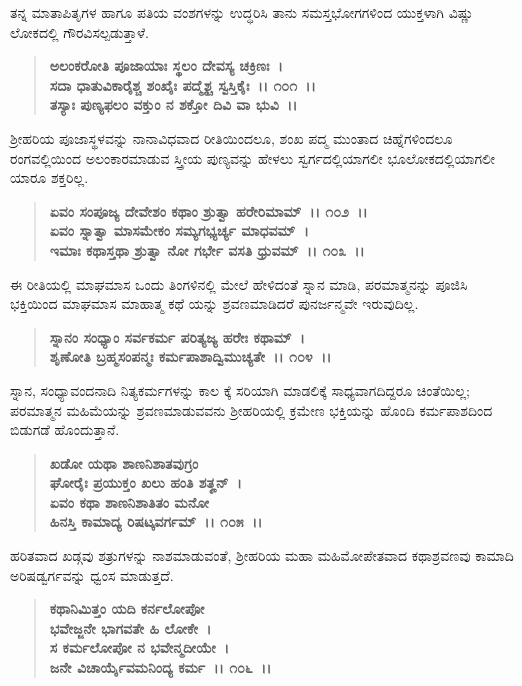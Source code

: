 ತನ್ನ ಮಾತಾಪಿತೃಗಳ ಹಾಗೂ ಪತಿಯ ವಂಶಗಳನ್ನು ಉದ್ಧರಿಸಿ ತಾನು ಸಮಸ್ತಭೋಗಗಳಿಂದ ಯುಕ್ತಳಾಗಿ ವಿಷ್ಣು ಲೋಕದಲ್ಲಿ ಗೌರವಿಸಲ್ಪಡುತ್ತಾಳೆ.

\begin{verse}
\textbf{ಅಲಂಕರೋತಿ ಪೂಜಾಯಾಃ ಸ್ಥಲಂ ದೇವಸ್ಯ ಚಕ್ರಿಣಃ~।}\\\textbf{ಸದಾ ಧಾತುವಿಕಾರೈಶ್ಚ ಶಂಖೈಃ ಪದ್ಮೈಶ್ಚ ಸ್ವಸ್ತಿಕೈಃ~।। ೧೦೧~।।}\\\textbf{ತಸ್ಯಾಃ ಪುಣ್ಯಫಲಂ ವಕ್ತುಂ ನ ಶಕ್ತೋ ದಿವಿ ವಾ ಭುವಿ~।।}
\end{verse}

ಶ‍್ರೀಹರಿಯ ಪೂಜಾಸ್ಥಳವನ್ನು ನಾನಾವಿಧವಾದ ರೀತಿಯಿಂದಲೂ, ಶಂಖ ಪದ್ಮ ಮುಂತಾದ ಚಿಹ್ನೆಗಳಿಂದಲೂ ರಂಗವಲ್ಲಿಯಿಂದ ಅಲಂಕಾರಮಾಡುವ ಸ್ತ್ರೀಯ ಪುಣ್ಯವನ್ನು ಹೇಳಲು ಸ್ವರ್ಗದಲ್ಲಿಯಾಗಲೀ ಭೂಲೋಕದಲ್ಲಿಯಾಗಲೀ ಯಾರೂ ಶಕ್ತರಿಲ್ಲ.

\begin{verse}
\textbf{ಏವಂ ಸಂಪೂಜ್ಯ ದೇವೇಶಂ ಕಥಾಂ ಶ್ರುತ್ವಾ ಹರೇರಿಮಾಮ್~।। ೧೦೨~।।}\\\textbf{ಏವಂ ಸ್ನಾತ್ವಾ ಮಾಸಮೇಕಂ ಸಮ್ಯಗಭ್ಯರ್ಚ್ಯ ಮಾಧವಮ್~।}\\\textbf{ಇಮಾಃ ಕಥಾಸ್ತಥಾ ಶ್ರುತ್ವಾ ನೋ ಗರ್ಭೇ ವಸತಿ ಧ್ರುವಮ್~।। ೧೦೩~।।}
\end{verse}

ಈ ರೀತಿಯಲ್ಲಿ ಮಾಘಮಾಸ ಒಂದು ತಿಂಗಳಿನಲ್ಲಿ ಮೇಲೆ ಹೇಳಿದಂತೆ ಸ್ನಾನ ಮಾಡಿ, ಪರಮಾತ್ಮನನ್ನು ಪೂಜಿಸಿ ಭಕ್ತಿಯಿಂದ ಮಾಘಮಾಸ ಮಾಹಾತ್ಮ ಕಥೆ ಯನ್ನು ಶ್ರವಣಮಾಡಿದರೆ ಪುನರ್ಜನ್ಮವೇ ಇರುವುದಿಲ್ಲ.

\begin{verse}
\textbf{ಸ್ನಾನಂ ಸಂಧ್ಯಾಂ ಸರ್ವಕರ್ಮ ಪರಿತ್ಯಜ್ಯ ಹರೇಃ ಕಥಾಮ್~।}\\\textbf{ಶೃಣೋತಿ ಬ್ರಹ್ಮಸಂಪನ್ಮಃ ಕರ್ಮಪಾಶಾದ್ವಿಮುಚ್ಯತೇ~।। ೧೦೪~।।}
\end{verse}

ಸ್ನಾನ, ಸಂಧ್ಯಾವಂದನಾದಿ ನಿತ್ಯಕರ್ಮಗಳನ್ನು ಕಾಲ ಕ್ಕೆ ಸರಿಯಾಗಿ ಮಾಡಲಿಕ್ಕೆ ಸಾಧ್ಯವಾಗದಿದ್ದರೂ ಚಿಂತೆಯಿಲ್ಲ; ಪರಮಾತ್ಮನ ಮಹಿಮೆಯನ್ನು ಶ್ರವಣಮಾಡುವವನು ಶ‍್ರೀಹರಿಯಲ್ಲಿ ಕ್ರಮೇಣ ಭಕ್ತಿಯನ್ನು ಹೊಂದಿ ಕರ್ಮಪಾಶದಿಂದ ಬಿಡುಗಡೆ ಹೊಂದುತ್ತಾನೆ.

\begin{verse}
\textbf{ಖಡೋ ಯಥಾ ಶಾಣನಿಶಾತವುಗ್ರಂ}\\\textbf{ಘೋರೈಃ ಪ್ರಯುಕ್ತಂ ಖಲು ಹಂತಿ ಶತೄನ್~। }\\\textbf{ಏವಂ ಕಥಾ ಶಾಣನಿಶಾತಿತಂ ಮನೋ} \\\textbf{ಹಿನಸ್ತಿ ಕಾಮಾದ್ಯ ರಿಷಟ್ಕವರ್ಗಮ್~।। ೧೦೫~।।}
\end{verse}

ಹರಿತವಾದ ಖಡ್ಗವು ಶತ್ರುಗಳನ್ನು ನಾಶಮಾಡುವಂತೆ, ಶ‍್ರೀಹರಿಯ ಮಹಾ ಮಹಿಮೋಪೇತವಾದ ಕಥಾಶ್ರವಣವು ಕಾಮಾದಿ ಅರಿಷಡ್ವರ್ಗವನ್ನು ಧ್ವಂಸ ಮಾಡುತ್ತದೆ.

\begin{verse}
\textbf{ಕಥಾನಿಮಿತ್ತಂ ಯದಿ ಕರ್ನಲೋಪೋ}\\\textbf{ಭವೇಜ್ಜನೇ ಭಾಗವತೇ ಹಿ ಲೋಕೇ~। }\\\textbf{ಸ ಕರ್ಮಲೋಪೋ ನ ಭವೇನ್ಮದೀಯೇ~।} \\\textbf{ಜನೇ ವಿಚಾರ್ಯೈವಮನಿಂದ್ಯ ಕರ್ಮ~।। ೧೦೬~।।}
\end{verse}


